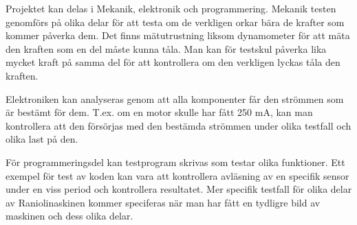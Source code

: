 Projektet kan delas i Mekanik, elektronik och programmering. Mekanik testen genomförs på olika delar för att testa om de verkligen orkar bära de krafter som kommer påverka dem. Det finns mätutrustning liksom dynamometer för att mäta den kraften som en del måste kunna tåla. Man kan för testskul påverka lika mycket kraft på samma del för att kontrollera om den verkligen lyckas tåla den kraften.

Elektroniken kan analyseras genom att alla komponenter får den strömmen som är bestämt för dem. T.ex. om en motor skulle har fått 250 mA, kan man kontrollera att den försörjas med den bestämda strömmen under olika testfall och olika last på den.

För programmeringsdel kan testprogram skrivas som testar olika funktioner. Ett exempel för test av koden kan vara att kontrollera avläsning av en specifik sensor under en viss period och kontrollera resultatet. Mer specifik testfall för olika delar av Raniolinaskinen kommer speciferas när man har fått en tydligre bild av maskinen och dess olika delar.